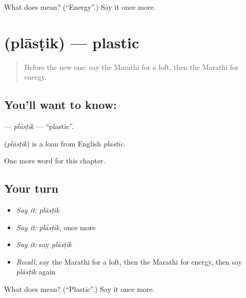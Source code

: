 \begin{tcolorbox}[breakable,colback=teal!4,colframe=teal!35!black,title={Before you move on}]
What does  mean? (\textquotedblleft{}Energy\textquotedblright{}.) Say it once more.
\end{tcolorbox}
\section[\texorpdfstring{\mr{प्लास्टिक} (plāsṭik)}{प्लास्टिक (plāsṭik)}]{ (plāsṭik) — plastic}

\label{lesson:MR-C214-plastik}



\begin{quote}
Before the new one: say the Marathi for a loft, then the Marathi for energy.
\end{quote}

\subsection*{You'll want to know: }
\textbf{} — \emph{plāsṭik} — \textquotedblleft{}plastic\textquotedblright{}.

\begin{cousinweb}
\textbf{} (\emph{plāsṭik}) is a loan from English \emph{plastic}.
\end{cousinweb}

\begin{grammarlens}[title={What you've built}]
One more word for this chapter.
\end{grammarlens}

\subsection*{Your turn}
\begin{itemize}
\raggedright
  \item \emph{Say it:} \emph{plāsṭik}
  \item \emph{Say it:} \emph{plāsṭik}, once more
  \item \emph{Say it:} say \emph{plāsṭik}
  \item \emph{Recall:} say the Marathi for a loft, then the Marathi for energy, then say \emph{plāsṭik} again
\end{itemize}

\begin{tcolorbox}[breakable,colback=teal!4,colframe=teal!35!black,title={Before you move on}]
What does  mean? (\textquotedblleft{}Plastic\textquotedblright{}.) Say it once more.
\end{tcolorbox}
